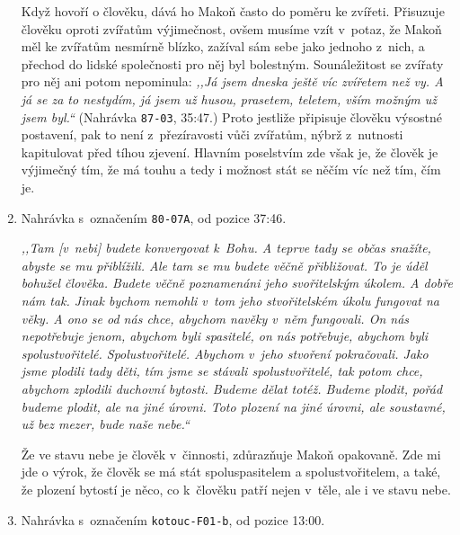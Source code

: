 \begin{enumerate}
{Když hovoří o člověku, dává ho Makoň často do poměru ke zvířeti. Přisuzuje
člověku oproti zvířatům výjimečnost, ovšem musíme vzít v~potaz, že Makoň měl ke
zvířatům nesmírně blízko, zažíval sám sebe jako jednoho z~nich, a přechod do
lidské společnosti pro něj byl bolestným\cite{KaMaUZ}. Sounáležitost se zvířaty
pro něj ani potom nepominula: \textit{,,Já jsem dneska ještě víc zvířetem než vy. A já
se za to nestydím, já jsem už husou, prasetem, teletem, vším možným už jsem
byl.``} (Nahrávka \texttt{87-03}, 35:47.) Proto jestliže připisuje člověku
výsostné postavení, pak to není z~přezíravosti vůči zvířatům, nýbrž z~nutnosti
kapitulovat před tíhou zjevení.
Hlavním poselstvím zde však je, že člověk je výjimečný tím, že má touhu a tedy i
možnost stát se něčím víc než tím, čím je.

}

\item{
Nahrávka s~označením \texttt{80-07A}, od pozice 37:46.

\textit{%
,,Tam [v~nebi] budete konvergovat k~Bohu. A teprve tady se občas snažíte, abyste se mu
přiblížili. Ale tam se mu budete věčně přibližovat. To je úděl bohužel člověka.
Budete věčně poznamenáni jeho svořitelským úkolem. A dobře nám tak. Jinak bychom
nemohli v~tom jeho stvořitelském úkolu fungovat na věky. A ono se od nás chce,
abychom navěky v~něm fungovali. On nás nepotřebuje jenom, abychom byli
spasitelé, on nás potřebuje, abychom byli spolustvořitelé. Spolustvořitelé.
Abychom v~jeho stvoření pokračovali. Jako jsme plodili tady děti, tím jsme se
stávali spolustvořitelé, tak potom chce, abychom zplodili duchovní bytosti.
Budeme dělat totéž. Budeme plodit, pořád budeme plodit, ale na jiné úrovni. Toto
plození na jiné úrovni, ale soustavné, už bez mezer, bude naše nebe.``
}

Že ve stavu nebe je člověk v~činnosti, zdůrazňuje Makoň opakovaně. Zde mi jde o
výrok, že člověk se má stát spoluspasitelem a spolustvořitelem, a také, že
plození bytostí je něco, co k~člověku patří nejen v~těle, ale i ve stavu nebe.

}

\item{
Nahrávka s~označením \texttt{kotouc-F01-b}, od pozice 13:00.

}
\end{enumerate}

